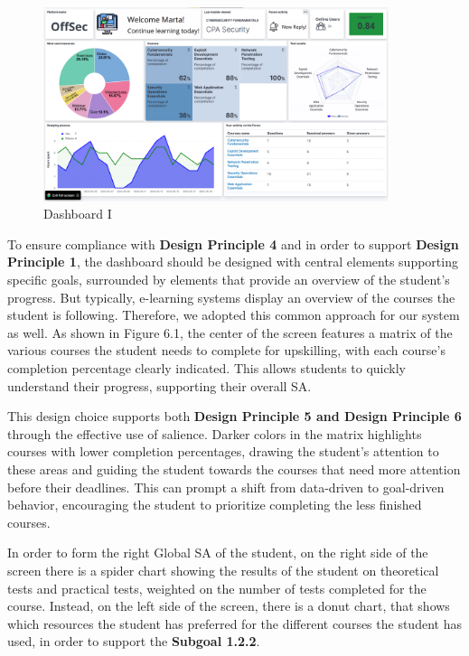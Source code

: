 \begin{figure}[H]
    \centering
    \includegraphics[width=0.9\textwidth]{assets/dashboard_1.png}
    \caption{Dashboard I}
    \label{fig:dashboard_1}
\end{figure}

To ensure compliance with \textbf{Design Principle 4} and in order to support \textbf{Design Principle 1}, the dashboard should be designed with central elements supporting specific goals, 
surrounded by elements that provide an overview of the student's progress. But typically, e-learning systems display an overview of the courses the student is following. 
Therefore, we adopted this common approach for our system as well.
As shown in Figure 6.1, the center of the screen features a matrix of the various courses the student needs to complete for upskilling, 
with each course's completion percentage clearly indicated. This allows students to quickly understand their progress, supporting their 
overall SA.

This design choice supports both \textbf{Design Principle 5 and Design Principle 6} through the effective use of salience. 
Darker colors in the matrix highlights courses with lower completion percentages, drawing the student's attention to these areas and guiding the student towards the courses that need more
attention before their deadlines. This can prompt a shift from data-driven to goal-driven behavior, encouraging the student to prioritize completing the less finished courses. 

In order to form the right Global SA of the student, on 
the right side of the screen there is a spider chart showing the results of the student on theoretical tests and
practical tests, weighted on the number of tests completed for the course.
Instead, on the left side of the screen, there is a
donut chart, that shows which resources the student has preferred for the different courses 
the student has used, in order to support the \textbf{Subgoal 1.2.2}.


